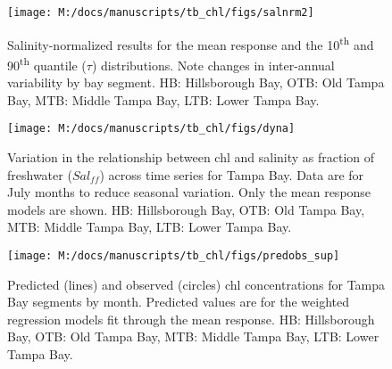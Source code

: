 \documentclass[letterpaper,12pt,oneside]{article}\usepackage[]{graphicx}\usepackage[]{color}
\newcommand{\beginsupplement}{%
        \setcounter{table}{0}
        \renewcommand{\thetable}{S\arabic{table}}%
        \setcounter{figure}{0}
        \renewcommand{\thefigure}{S\arabic{figure}}%
     }
\begin{document}
\begin{landscape}
\centering\vspace*{\fill}
\begin{figure}[!ht]


{\centering \texttt{[image: M:/docs/manuscripts/tb\_chl/figs/salnrm2]} 

}

\caption[Salinity-normalized results for the mean response and the 10\textsuperscript{th} and 90\textsuperscript{th} quantile ($\tau$) distributions]{Salinity-normalized results for the mean response and the 10\textsuperscript{th} and 90\textsuperscript{th} quantile ($\tau$) distributions. Note changes in inter-annual variability by bay segment. HB: Hillsborough Bay, OTB: Old Tampa Bay, MTB: Middle Tampa Bay, LTB: Lower Tampa Bay.\label{fig:salnrm2}}
\end{figure}


\vfill
\end{landscape}

\begin{landscape}
\centering\vspace*{\fill}
\begin{figure}[!ht]


{\centering \texttt{[image: M:/docs/manuscripts/tb\_chl/figs/dyna]} 

}

\caption[Variation in the relationship between \ac{chl} and salinity as fraction of freshwater ($Sal_{ff}$) across time series for Tampa Bay]{Variation in the relationship between \ac{chl} and salinity as fraction of freshwater ($Sal_{ff}$) across time series for Tampa Bay. Data are for July months to reduce seasonal variation. Only the mean response models are shown. HB: Hillsborough Bay, OTB: Old Tampa Bay, MTB: Middle Tampa Bay, LTB: Lower Tampa Bay.\label{fig:dyna}}
\end{figure}


\vfill
\end{landscape}

\beginsupplement
\begin{landscape}
\centering\vspace*{\fill}
\begin{figure}[!ht]


{\centering \texttt{[image: M:/docs/manuscripts/tb\_chl/figs/predobs\_sup]} 

}

\caption[Predicted (lines) and observed (circles) \ac{chl} concentrations for Tampa Bay segments by month]{Predicted (lines) and observed (circles) \ac{chl} concentrations for Tampa Bay segments by month.  Predicted values are for the weighted regression models fit through the mean response. HB: Hillsborough Bay, OTB: Old Tampa Bay, MTB: Middle Tampa Bay, LTB: Lower Tampa Bay.\label{fig:predobs_sup}}
\end{figure}


\vfill
\end{landscape}
\end{document}
